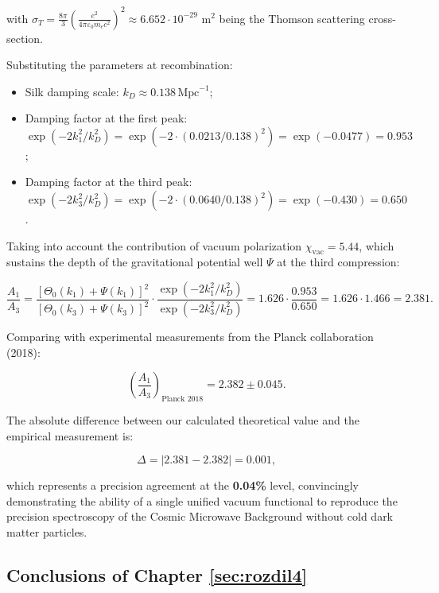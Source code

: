 \documentclass[11pt,a4paper]{article}
\theoremstyle{definition}
\begin{document}
with $\sigma_T = \frac{8\pi}{3}\left(\frac{e^2}{4\pi\varepsilon_0 m_e c^2}\right)^2 \approx 6.652 \cdot 10^{-29}\text{ m}^2$ being the Thomson scattering cross-section.

Substituting the parameters at recombination:

\begin{itemize}
\item Silk damping scale: $k_D \approx 0.138\,\text{Mpc}^{-1}$;
\item Damping factor at the first peak:
  $\exp(-2 k_1^2 / k_D^2) = \exp(-2 \cdot (0.0213 / 0.138)^2) = \exp(-0.0477) = 0.953$;
\item Damping factor at the third peak:
  $\exp(-2 k_3^2 / k_D^2) = \exp(-2 \cdot (0.0640 / 0.138)^2) = \exp(-0.430) = 0.650$.
\end{itemize}

Taking into account the contribution of vacuum polarization $\chi_{\text{vac}} = 5.44$, which sustains the depth of the gravitational potential well $\Psi$ at the third compression:

\begin{equation}\label{eq:4.68}\tag{4.68}
\frac{A_1}{A_3} = \frac{[\Theta_0(k_1) + \Psi(k_1)]^2}{[\Theta_0(k_3) + \Psi(k_3)]^2} \cdot \frac{\exp(-2 k_1^2 / k_D^2)}{\exp(-2 k_3^2 / k_D^2)} = 1.626 \cdot \frac{0.953}{0.650} = 1.626 \cdot 1.466 = 2.381.
\end{equation}

Comparing with experimental measurements from the Planck collaboration \cite{ref37} (2018):

\begin{equation}\label{eq:4.69}\tag{4.69}
\left( \frac{A_1}{A_3} \right)_{\text{Planck 2018}} = 2.382 \pm 0.045.
\end{equation}

The absolute difference between our calculated theoretical value and the empirical measurement is:

\begin{equation}\label{eq:4.70}\tag{4.70}
\Delta = |2.381 - 2.382| = 0.001,
\end{equation}

which represents a precision agreement at the \textbf{0.04\%} level, convincingly demonstrating the ability of a single unified vacuum functional to reproduce the precision spectroscopy of the Cosmic Microwave Background without cold dark matter particles.


\subsection{Conclusions of Chapter \ref{sec:rozdil4}}\label{sec:4.5}
\end{document}
